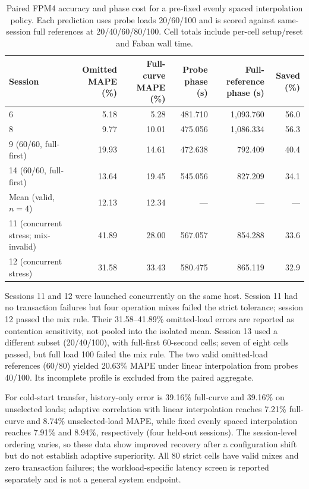 \documentclass[sigconf, review, anonymous, balance=false]{acmart}
\begin{document}
\begin{table}[t]
\centering
\caption{Paired FPM4 accuracy and phase cost for a pre-fixed evenly spaced interpolation policy. Each prediction uses probe loads 20/60/100 and is scored against same-session full references at 20/40/60/80/100. Cell totals include per-cell setup/reset and Faban wall time.}
\label{tab:cloudsuite-paired-fpm4}
\small
\setlength{\tabcolsep}{6pt}
\begin{tabular}{lrrrrr}
\toprule
\textbf{Session} & \textbf{Omitted MAPE (\%)} & \textbf{Full-curve MAPE (\%)} & \textbf{Probe phase (s)} & \textbf{Full-reference phase (s)} & \textbf{Saved (\%)} \\
\midrule
6 & 5.18 & 5.28 & 481.710 & 1,093.760 & 56.0 \\
8 & 9.77 & 10.01 & 475.056 & 1,086.334 & 56.3 \\
9 (60/60, full-first) & 19.93 & 14.61 & 472.638 & 792.409 & 40.4 \\
14 (60/60, full-first) & 13.64 & 19.45 & 545.056 & 827.209 & 34.1 \\
Mean (valid, $n=4$) & 12.13 & 12.34 & --- & --- & --- \\
11 (concurrent stress; mix-invalid) & 41.89 & 28.00 & 567.057 & 854.288 & 33.6 \\
12 (concurrent stress) & 31.58 & 33.43 & 580.475 & 865.119 & 32.9 \\
\bottomrule
\end{tabular}
\end{table}

Sessions 11 and 12 were launched concurrently on the same host. Session 11 had no transaction failures but four operation mixes failed the strict tolerance; session 12 passed the mix rule. Their 31.58--41.89\% omitted-load errors are reported as contention sensitivity, not pooled into the isolated mean. Session 13 used a different subset (20/40/100), with full-first 60-second cells; seven of eight cells passed, but full load 100 failed the mix rule. The two valid omitted-load references (60/80) yielded 20.63\% MAPE under linear interpolation from probes 40/100. Its incomplete profile is excluded from the paired aggregate.

For cold-start transfer, history-only error is 39.16\% full-curve and 39.16\% on unselected loads; adaptive correlation with linear interpolation reaches 7.21\% full-curve and 8.74\% unselected-load MAPE, while fixed evenly spaced interpolation reaches 7.91\% and 8.94\%, respectively (four held-out sessions). The session-level ordering varies, so these data show improved recovery after a configuration shift but do not establish adaptive superiority. All 80 strict cells have valid mixes and zero transaction failures; the workload-specific latency screen is reported separately and is not a general system endpoint.
\end{document}
